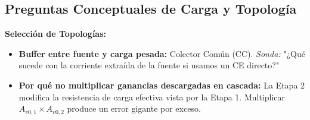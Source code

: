 \documentclass[11pt, a4paper]{article}
\begin{document}
\subsection*{Preguntas Conceptuales de Carga y Topología}
\textbf{Selección de Topologías:}
\begin{itemize}
    \item \textbf{Buffer entre fuente y carga pesada:} Colector Común (CC). \textit{Sonda:} "¿Qué sucede con la corriente extraída de la fuente si usamos un CE directo?"
    \item \textbf{Por qué no multiplicar ganancias descargadas en cascada:} La Etapa 2 modifica la resistencia de carga efectiva vista por la Etapa 1. Multiplicar $A_{v0,1} \times A_{v0,2}$ produce un error gigante por exceso.
\end{itemize}
\end{document}
